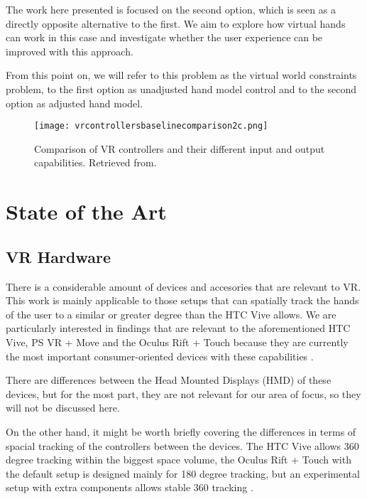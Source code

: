 The work here presented is focused on the second option, which is seen as a directly opposite alternative to the first. We aim to explore how virtual hands can work in this case and investigate whether the user experience can be improved with this approach.

From this point on, we will refer to this problem as the virtual world constraints problem, to the first option as unadjusted hand model control and to the second option as adjusted hand model.

\begin{figure}[H]
\centering
\texttt{[image: vrcontrollersbaselinecomparison2c.png]}
\caption{Comparison of VR controllers and their different input and output capabilities. Retrieved from\parencite{MetanautVR2015}.}
\label{fig:vrControllerComparison}
\end{figure}

\section{State of the Art}
\label{sec:stateOfTheArt}

\subsection{VR Hardware}
\label{subsec:vrHardware}

There is a considerable amount of devices and accesories that are relevant to VR. This work is mainly applicable to those setups that can spatially track the hands of the user to a similar or greater degree than the HTC Vive allows. We are particularly interested in findings that are relevant to the aforementioned HTC Vive, PS VR + Move and the Oculus Rift + Touch because they are currently the most important consumer-oriented devices with these capabilities \parencite{Armstrong2017, SuperDataLLC2017}.



There are differences between the Head Mounted Displays (HMD) of these devices, but for the most part, they are not relevant for our area of focus, so they will not be discussed here.

On the other hand, it might be worth briefly covering the differences in terms of spacial tracking of the controllers between the devices. The HTC Vive allows 360 degree tracking within the biggest space volume, the Oculus Rift + Touch with the default setup is designed mainly for 180 degree tracking, but an experimental setup with extra components allows stable 360 tracking \parencite{Lang2016, Kuchera2016}.

